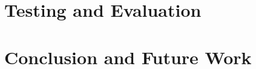 \documentclass[UKenglish, a4paper]{ifimaster}
\begin{document}
\chapter{Testing and Evaluation}
\label{evaluation}


\chapter{Conclusion and Future Work}
\label{ch:conclusion-and-future-work}


\backmatter{}
\printbibliography{}
\end{document}
